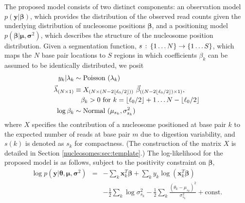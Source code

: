 The proposed model consists of two distinct components: an observation model $p(\bm y | \bm \beta)$, which provides the distribution of the observed read counts given the underlying distribution of nucleosome positions $\bm \beta$, and a positioning model $p(\bm \beta | \bm \mu, \bm \sigma^2)$, which describes the structure of the nucleosome position distribution.
%
Given a segmentation function, $s \,:\, \left\{1 \ldots N\right\} \rightarrow \left\{1 \ldots S\right\}$, which maps the $N$ base pair locations to $S$ regions in which coefficients $\beta_k$ can be assumed to be identically distributed, we posit
\begin{align}
 \label{nucleosomes:eq:observation_model}
  y_k|\lambda_k         & \sim \hbox{Poisson } (\lambda_k) \\
 \label{nucleosomes:eq:linear_model}
  \bm \lambda_{(N\times 1)} & \equiv X_{(N\times (N - 2 \lfloor \ell_0 / 2 \rfloor))} ~ \bm \beta_{((N - 2 \lfloor \ell_0 / 2 \rfloor)\times 1)}, \\
\nonumber & \quad \beta_k>0 \hbox{ for } k=\lfloor \ell_0 / 2 \rfloor + 1 \dots N - \lfloor \ell_0 / 2 \rfloor \\
\label{nucleosomes:eq:positioning_model}
  \log \beta_k        & \sim \hbox{Normal } (\mu_{s_k},\sigma^2_{s_k})
\end{align}
where $X$ specifies the contribution of a nucleosome positioned at base pair $k$ to the expected number of reads at base pair $m$ due to digestion variability, and $s(k)$ is denoted as $s_k$ for compactness.
(The construction of the matrix $X$ is detailed in Section \ref{nucleosomes:sec:template}.)
%
The log-likelihood for the proposed model is as follows, subject to the positivity constraint on $\bm \beta$,
\begin{eqnarray}
\label{nucleosomes:eq:logLikelihood}
 \log p(\bm y | \bm \theta, \bm \mu, \bm \sigma^2) &=& -\sum_k
\bm x_k^T \bm \beta + \sum_k y_k \log \left( \bm x_k^T \bm \beta \right)  \\
 \nonumber && - \frac{1}{2} \sum_k \log \sigma^2_{s_k} -
  \frac{1}{2} \sum_k \frac{(\theta_k - \mu_{s_k})^2}{\sigma^2_{s_k}}
  + \mathrm{const}.
\end{eqnarray}

